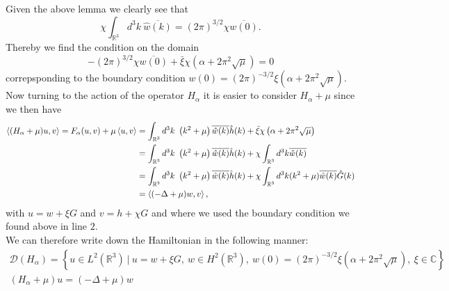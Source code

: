 \documentclass[a4paper,11pt]{article}
\newcommand{\dom}[1]{\mathscr D\left(#1\right)}
\newcommand{\R}{\mathbb{R}}
\newcommand{\C}{\mathbb{C}}
\numberwithin{equation}{section}
\begin{document}
Given the above lemma we clearly see that \begin{equation}
\chi\int_{\R^3} d^3k\ \overline{\hat{w}(k)}=(2\pi)^{3/2}\chi\overline{w(0)}.
\end{equation}
Thereby we find the condition on the domain\begin{equation}
-(2\pi)^{3/2}\chi\overline{w(0)}+\bar{\xi}\chi(\alpha+2\pi^2\sqrt{\mu})=0
\end{equation}
correpsponding to the boundary condition $ w(0)=(2\pi)^{-3/2}\xi(\alpha+2\pi^2\sqrt{\mu}) $. Now turning to the action of the operator $ H_\alpha $ it is easier to consider $ H_\alpha+\mu $ since we then have \begin{equation}
\begin{aligned}
\braket{(H_\alpha+\mu)u,v}=F_\alpha(u,v)+\mu\braket{u,v}&=\int_{\R^3} d^3k\ \left(k^2+\mu\right)\overline{\hat{w}(k)}\hat{h}(k)+\bar{\xi}\chi\left(\alpha+2\pi^2\sqrt{\mu}\right)\\
&=\int_{\R^3} d^3k\ \left(k^2+\mu\right)\overline{\hat{w}(k)}\hat{h}(k)+\chi\int_{\R^3}d^3k \overline{\hat{w}(k)}\\
&=\int_{\R^3} d^3k\ \left(k^2+\mu\right)\overline{\hat{w}(k)}\hat{h}(k)+\chi\int_{\R^3}d^3k(k^2+\mu) \overline{\hat{w}(k)}\hat{G}(k)\\
&=\braket{(-\Delta+\mu)w,v},
\end{aligned}
\end{equation}
with $ u=w+\xi G $ and $ v=h+\chi G $ and where we used the boundary condition we found above in line $ 2 $.\\
 We can therefore write down the Hamiltonian in the following manner:\begin{equation}
\begin{aligned}
\dom{H_\alpha}=\left\{ u\in L^2(\R^3)\ |\ u=w+\xi G,\ w\in H^2(\R^3),\ w(0)=(2\pi)^{-3/2}\xi(\alpha+2\pi^2\sqrt{\mu}),\ \xi\in\C \right\}\\
(H_\alpha+\mu)u=(-\Delta+\mu)w\qquad\qquad\qquad\qquad\qquad\qquad\qquad
\end{aligned}
\end{equation}
\end{document}
